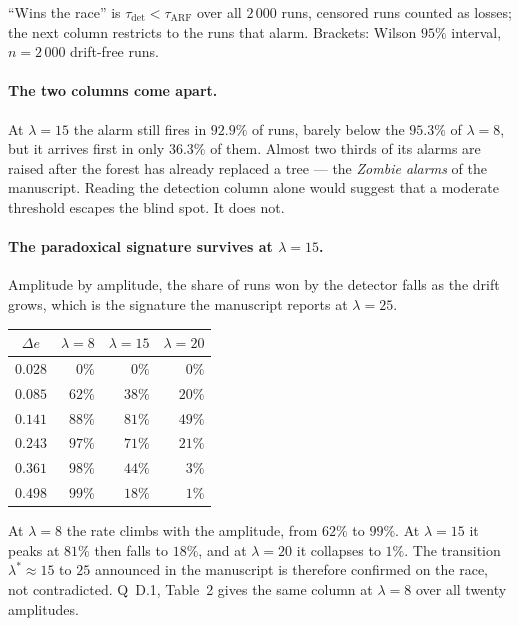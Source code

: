 \documentclass[11pt,a4paper]{article}
\begin{document}
\noindent ``Wins the race'' is $\tau_{\mathrm{det}} < \tau_{\mathrm{ARF}}$ over all
$2\,000$ runs, censored runs counted as losses; the next column restricts to the runs that
alarm. Brackets: Wilson $95\%$ interval, $n = 2\,000$ drift-free runs.

\paragraph{The two columns come apart.} At $\lambda = 15$ the alarm still fires in
$92.9\%$ of runs, barely below the $95.3\%$ of $\lambda = 8$, but it arrives first in only
$36.3\%$ of them. Almost two thirds of its alarms are raised after the forest has already
replaced a tree --- the \emph{Zombie alarms} of the manuscript. Reading the detection
column alone would suggest that a moderate threshold escapes the blind spot. It does not.

\paragraph{The paradoxical signature survives at $\lambda = 15$.} Amplitude by amplitude,
the share of runs won by the detector falls as the drift grows, which is the signature the
manuscript reports at $\lambda = 25$.

\begin{center}
\begin{tabular}{crrr}
\toprule
$\Delta e$ & $\lambda = 8$ & $\lambda = 15$ & $\lambda = 20$ \\
\midrule
$0.028$ & $0\%$  & $0\%$  & $0\%$ \\
$0.085$ & $62\%$ & $38\%$ & $20\%$ \\
$0.141$ & $88\%$ & $81\%$ & $49\%$ \\
$0.243$ & $97\%$ & $71\%$ & $21\%$ \\
$0.361$ & $98\%$ & $44\%$ & $3\%$ \\
$0.498$ & $99\%$ & $18\%$ & $1\%$ \\
\bottomrule
\end{tabular}
\end{center}

\noindent At $\lambda = 8$ the rate climbs with the amplitude, from $62\%$ to $99\%$. At
$\lambda = 15$ it peaks at $81\%$ then falls to $18\%$, and at $\lambda = 20$ it collapses
to $1\%$. The transition $\lambda^* \approx 15$ to $25$ announced in the manuscript is
therefore confirmed on the race, not contradicted. Q~D.1, Table~2 gives the same column at
$\lambda = 8$ over all twenty amplitudes.
\end{document}
